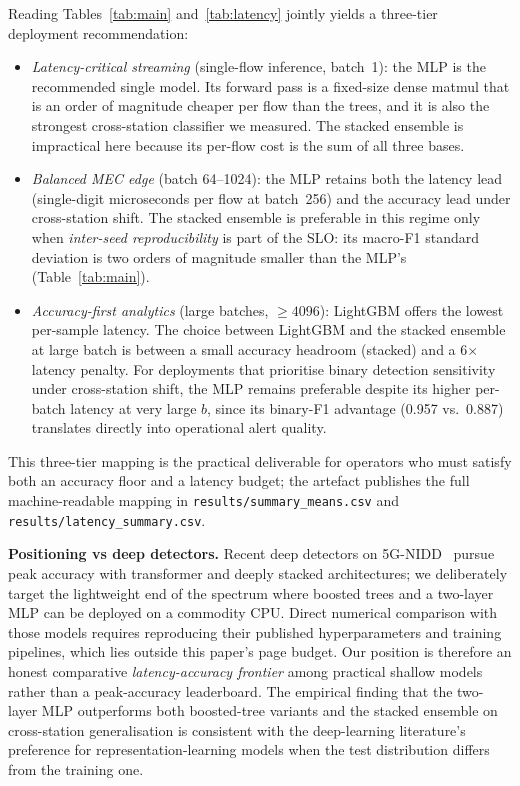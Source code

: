 \documentclass[conference]{IEEEtran}
\begin{document}
Reading Tables~\ref{tab:main} and~\ref{tab:latency} jointly yields a
three-tier deployment recommendation:
\begin{itemize}
    \item \emph{Latency-critical streaming} (single-flow inference, batch~1):
        the MLP is the recommended single model. Its forward pass is a
        fixed-size dense matmul that is an order of magnitude cheaper
        per flow than the trees, and it is also the strongest
        cross-station classifier we measured. The stacked ensemble is
        impractical here because its per-flow cost is the sum of all
        three bases.
    \item \emph{Balanced MEC edge} (batch 64--1024): the MLP retains
        both the latency lead (single-digit microseconds per flow at
        batch~256) and the accuracy lead under cross-station shift.
        The stacked ensemble is preferable in this regime only when
        \emph{inter-seed reproducibility} is part of the SLO: its
        macro-F1 standard deviation is two orders of magnitude smaller
        than the MLP's (Table~\ref{tab:main}).
    \item \emph{Accuracy-first analytics} (large batches, $\geq 4096$):
        LightGBM offers the lowest per-sample latency. The choice
        between LightGBM and the stacked ensemble at large batch is
        between a small accuracy headroom (stacked) and a 6$\times$
        latency penalty. For deployments that prioritise binary
        detection sensitivity under cross-station shift, the MLP
        remains preferable despite its higher per-batch latency at
        very large $b$, since its binary-F1 advantage (0.957 vs.\
        0.887) translates directly into operational alert quality.
\end{itemize}
This three-tier mapping is the practical deliverable for operators who
must satisfy both an accuracy floor and a latency budget; the artefact
publishes the full machine-readable mapping in
\texttt{results/summary\_means.csv} and \texttt{results/latency\_summary.csv}.

\textbf{Positioning vs deep detectors.}
Recent deep detectors on 5G-NIDD~\cite{toupas2025_deeptransids,ahmed2023_dsem,
shi2024_5g_ddos_cnn_lstm} pursue peak accuracy with transformer and
deeply stacked architectures; we deliberately target the lightweight
end of the spectrum where boosted trees and a two-layer MLP can be
deployed on a commodity CPU. Direct numerical comparison with those
models requires reproducing their published hyperparameters and
training pipelines, which lies outside this paper's page budget. Our
position is therefore an honest comparative \emph{latency-accuracy
frontier} among practical shallow models rather than a peak-accuracy
leaderboard. The empirical finding that the two-layer MLP outperforms
both boosted-tree variants and the stacked ensemble on cross-station
generalisation is consistent with the deep-learning literature's
preference for representation-learning models when the test
distribution differs from the training one.
\end{document}
